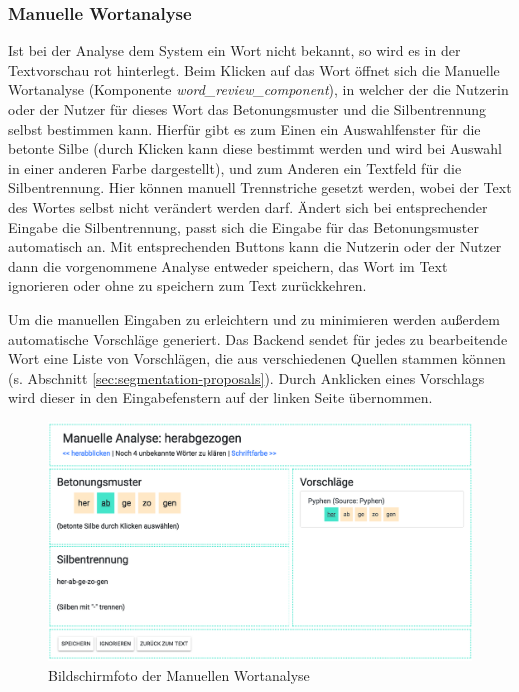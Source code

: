 \subsubsection{Manuelle Wortanalyse}
\label{sec:manuelleanalyse}

Ist bei der Analyse dem System ein Wort nicht bekannt, so wird es in der Textvorschau rot hinterlegt. Beim Klicken auf das Wort öffnet sich die Manuelle Wortanalyse (Komponente \textit{word\_review\_component}), in welcher der die Nutzerin oder der Nutzer für dieses Wort das Betonungsmuster und die Silbentrennung selbst bestimmen kann. Hierfür gibt es zum Einen ein Auswahlfenster für die betonte Silbe (durch Klicken kann diese bestimmt werden und wird bei Auswahl in einer anderen Farbe dargestellt), und zum Anderen ein Textfeld für die Silbentrennung. Hier können manuell Trennstriche gesetzt werden, wobei der Text des Wortes selbst nicht verändert werden darf. Ändert sich bei entsprechender Eingabe die Silbentrennung, passt sich die Eingabe für das Betonungsmuster automatisch an. Mit entsprechenden Buttons kann die Nutzerin oder der Nutzer dann die vorgenommene Analyse entweder speichern, das Wort im Text ignorieren oder ohne zu speichern zum Text zurückkehren.

Um die manuellen Eingaben zu erleichtern und zu minimieren werden außerdem automatische Vorschläge generiert. Das Backend sendet für jedes zu bearbeitende Wort eine Liste von Vorschlägen, die aus verschiedenen Quellen stammen können (s. Abschnitt \ref{sec:segmentation-proposals}). Durch Anklicken eines Vorschlags wird dieser in den Eingabefenstern auf der linken Seite übernommen.

\begin{figure}[h!]
	\centering
	\includegraphics[width=.8\linewidth]{figures/frontend/manuelle-analyse}
	\caption{Bildschirmfoto der Manuellen Wortanalyse}
	\label{fig:frontend-manuelle-analyse}
\end{figure}

